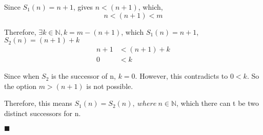 \documentclass[12pt]{article}
\begin{document}
Since $S_1(n) = n+1$, gives $n < (n+1)$, which, 
$$n<(n+1)<m$$

Therefore, $\exists k \in \mathbb{N}, k = m - (n+1)$, which $S_1(n)=n+1$, $S_2(n)=(n+1)+k$
\begin{align*}
    n+1 &< (n+1)+k \\
    0 &< k
\end{align*}


Since when $S_2$ is the successor of n, $k=0$. However, this contradicts to $0<k$. So the option $m > (n+1)$ is not possible.

\noindent Therefore, this means $S_1(n) = S_2(n),\ where\ n \in \mathbb{N}$, which there can
t be two distinct successors for n.

\quad \quad \quad \quad \quad \quad \quad \quad \quad \quad \quad \quad \quad \quad \quad \quad \quad \quad \quad \quad \quad \quad \quad \quad \quad \quad \quad \quad \quad \quad \quad \quad \quad \quad \quad \quad \quad \quad \quad $\blacksquare$
\end{document}
